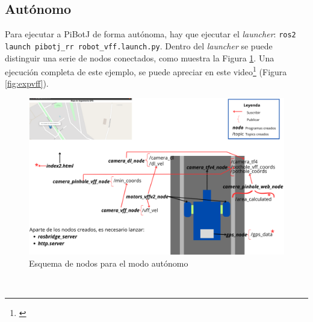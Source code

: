 


\subsection{Autónomo}

Para ejecutar a PiBotJ de forma autónoma, hay que ejecutar el \textit{launcher}: \verb|ros2 launch pibotj_rr robot_vff.launch.py|. Dentro del \textit{launcher} se puede distinguir una serie de nodos conectados, como muestra la Figura \ref{fig:nodosvff}. Una ejecución completa de este ejemplo, se puede apreciar en este video\footnote{\url{}} (Figura \ref{fig:expvff}). 

\begin{figure} [h!]
	\begin{center}
			\includegraphics[width=15cm]{figs/cap7/esquema_nodos_vff_ampliado.png}
		\end{center}
	\caption{Esquema de nodos para el modo autónomo}
	\label{fig:nodosvff}
\end{figure}\

